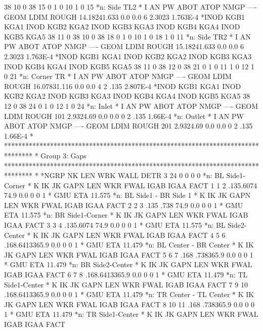    38   10    0   38   15    0    1    0   10    1    0   15
*n: Side TL2
*   I   AN   PW ABOT ATOP NMGP ---- GEOM LDIM     ROUGH
   14.18241.633  0.0  0.0    6         2.3023  1.763E-4
*INOD KGB1 KGA1 INOD KGB2 KGA2 INOD KGB3 KGA3 INOD KGB4 KGA4 INOD KGB5 KGA5
   38   11    0   38   10    0   38   18    0    1    0   10    1    0   18
    1    0   11
*n: Side TR2
*   I   AN   PW ABOT ATOP NMGP ---- GEOM LDIM     ROUGH
   15.18241.633  0.0  0.0    6         2.3023  1.763E-4
*INOD KGB1 KGA1 INOD KGB2 KGA2 INOD KGB3 KGA3 INOD KGB4 KGA4 INOD KGB5 KGA5
   38   11    0   38   12    0   38   21    0    1    0   11    1    0   12
    1    0   21
*n: Corner TR
*   I   AN   PW ABOT ATOP NMGP ---- GEOM LDIM     ROUGH
   16.07831.116  0.0  0.0    4         2 .135  2.807E-4
*INOD KGB1 KGA1 INOD KGB2 KGA2 INOD KGB3 KGA3 INOD KGB4 KGA4 INOD KGB5 KGA5
   38   12    0   38   24    0    1    0   12    1    0   24
*n: Inlet
*   I   AN   PW ABOT ATOP NMGP ---- GEOM LDIM     ROUGH
  101 2.9324.69  0.0  0.0    0         2 .135   1.66E-4
*n: Outlet
*   I   AN   PW ABOT ATOP NMGP ---- GEOM LDIM     ROUGH
  201 2.9324.69  0.0  0.0    0         2 .135   1.66E-4
*
********************************************************************************
* Group 3: Gaps
********************************************************************************
*
*NGRP   NK  LEN  WRK WALL DETR
    3   24    0    0    0    0
*n: BL Side1-Corner
*   K   IK   JK GAPN  LEN  WKR FWAL IGAB IGAA FACT
    1    1    2 .135.6074 74.9  0.0    0    0    1
* GMU  ETA
    11.575
*n: BL Side1 - BR Side 1
*   K   IK   JK GAPN  LEN  WKR FWAL IGAB IGAA FACT
    2    2    3 .135 .738 74.9  0.0    0    0    1
* GMU  ETA
    11.575
*n: BR Side1-Corner
*   K   IK   JK GAPN  LEN  WKR FWAL IGAB IGAA FACT
    3    3    4 .135.6074 74.9  0.0    0    0    1
* GMU  ETA
    11.575
*n: BL Side2-Center
*   K   IK   JK GAPN  LEN  WKR FWAL IGAB IGAA FACT
    4    5    6 .168.6413365.9  0.0    0    0    1
* GMU  ETA
    11.479
*n: BL Center - BR Center
*   K   IK   JK GAPN  LEN  WKR FWAL IGAB IGAA FACT
    5    6    7 .168 .738365.9  0.0    0    0    1
* GMU  ETA
    11.479
*n: BR Side2-Center
*   K   IK   JK GAPN  LEN  WKR FWAL IGAB IGAA FACT
    6    7    8 .168.6413365.9  0.0    0    0    1
* GMU  ETA
    11.479
*n: TL Side1-Center
*   K   IK   JK GAPN  LEN  WKR FWAL IGAB IGAA FACT
    7    9   10 .168.6413365.9  0.0    0    0    1
* GMU  ETA
    11.479
*n: TR Center - TL Center
*   K   IK   JK GAPN  LEN  WKR FWAL IGAB IGAA FACT
    8   10   11 .168 .738365.9  0.0    0    0    1
* GMU  ETA
    11.479
*n: TR Side1-Center
*   K   IK   JK GAPN  LEN  WKR FWAL IGAB IGAA FACT
